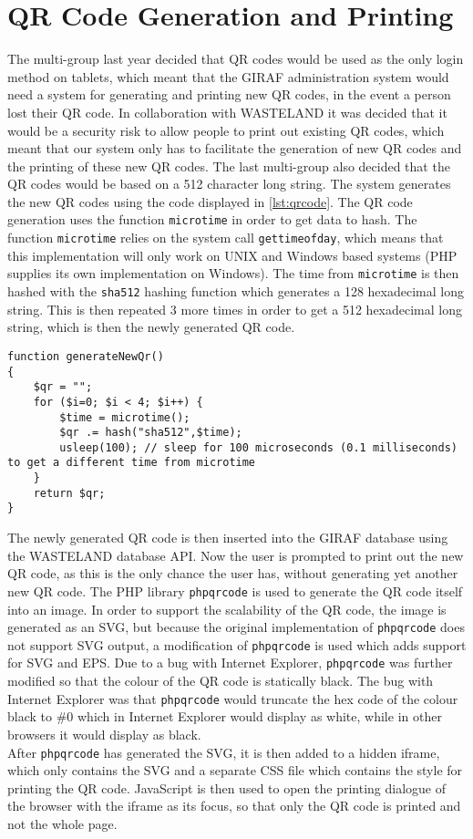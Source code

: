\section{QR Code Generation and Printing}
\label{sec:qr}
The multi-group last year decided that QR codes would be used as the only login method on tablets, which meant that the GIRAF administration system would need a system for generating and printing new QR codes, in the event a person lost their QR code. In collaboration with WASTELAND it was decided that it would be a security risk to allow people to print out existing QR codes, which meant that our system only has to facilitate the generation of new QR codes and the printing of these new QR codes. The last multi-group also decided that the QR codes would be based on a 512 character long string. The system generates the new QR codes using the code displayed in \autoref{lst:qrcode}. The QR code generation uses the function \texttt{microtime} in order to get data to hash. The function \texttt{microtime} relies on the system call \texttt{gettimeofday}, which means that this implementation will only work on UNIX and Windows based systems (PHP supplies its own implementation on Windows). The time from \texttt{microtime} is then hashed with the \texttt{sha512} hashing function which generates a 128 hexadecimal long string. This is then repeated 3 more times in order to get a 512 hexadecimal long string, which is then the newly generated QR code.

\begin{lstlisting}[firstline=1,caption={QR Code Generation},label=lst:qrcode]
function generateNewQr()
{
	$qr = "";
	for ($i=0; $i < 4; $i++) { 
		$time = microtime();
		$qr .= hash("sha512",$time);
		usleep(100); // sleep for 100 microseconds (0.1 milliseconds) to get a different time from microtime
	}
	return $qr;
}
\end{lstlisting}

The newly generated QR code is then inserted into the GIRAF database using the WASTELAND database API. Now the user is prompted to print out the new QR code, as this is the only chance the user has, without generating yet another new QR code. The PHP library \texttt{phpqrcode}\citep{phpqrcode} is used to generate the QR code itself into an image. In order to support the scalability of the QR code, the image is generated as an SVG, but because the original implementation of \texttt{phpqrcode} does not support SVG output, a modification of \texttt{phpqrcode} is used\citep{phpqrcodet0k4rt} which adds support for SVG and EPS. Due to a bug with Internet Explorer, \texttt{phpqrcode} was further modified so that the colour of the QR code is statically black. The bug with Internet Explorer was that \texttt{phpqrcode} would truncate the hex code of the colour black to \#0 which in Internet Explorer would display as white, while in other browsers it would display as black. \\
After \texttt{phpqrcode} has generated the SVG, it is then added to a hidden iframe, which only contains the SVG and a separate CSS file which contains the style for printing the QR code. JavaScript is then used to open the printing dialogue of the browser with the iframe as its focus, so that only the QR code is printed and not the whole page.
